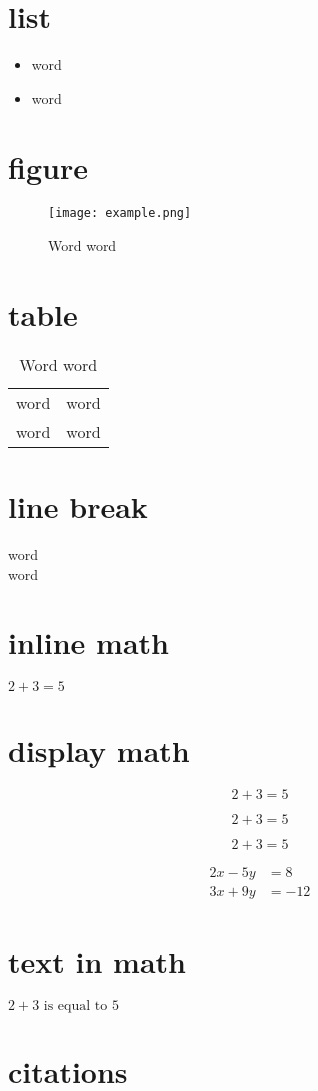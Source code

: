 \documentclass{article}
\begin{document}
\section{list}
\begin{itemize}
    \item word %
    \item word %
\end{itemize}

\section{figure}
\begin{figure}
    \texttt{[image: example.png]} %
    \caption{Word word} %
\end{figure}

\section{table}
\begin{table}
    \begin{tabular}{c|c}
       word & word \\ %
       word & word %
    \end{tabular}
    \caption{Word word} %
\end{table}

\section{line break}
word\\word %

\section{inline math}
$2+3=5$ %

\section{display math}
\[2+3=5\]

\begin{equation}
    2+3=5
\end{equation}

\begin{equation*}
    2+3=5
\end{equation*}

\begin{align*}
2x - 5y &=  8 \\
3x + 9y &=  -12
\end{align*}

\section{text in math}

$ 2+3 \text{ is equal to } 5 $

\section{citations}
\cite[two words]{example2025} %
\end{document}
